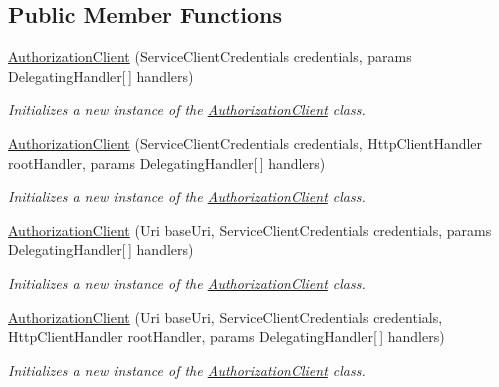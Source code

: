 \subsection*{Public Member Functions}
\begin{DoxyCompactItemize}
\item 
\hyperlink{class_microsoft_1_1_azure_1_1_management_1_1_resources_1_1_authorization_client_a3715cd8839e758d773915b9b58e24d67}{Authorization\+Client} (Service\+Client\+Credentials credentials, params Delegating\+Handler\mbox{[}$\,$\mbox{]} handlers)
\begin{DoxyCompactList}\small\item\em Initializes a new instance of the \hyperlink{class_microsoft_1_1_azure_1_1_management_1_1_resources_1_1_authorization_client}{Authorization\+Client} class. \end{DoxyCompactList}\item 
\hyperlink{class_microsoft_1_1_azure_1_1_management_1_1_resources_1_1_authorization_client_a04f9939262d07f9be68c0634027a2914}{Authorization\+Client} (Service\+Client\+Credentials credentials, Http\+Client\+Handler root\+Handler, params Delegating\+Handler\mbox{[}$\,$\mbox{]} handlers)
\begin{DoxyCompactList}\small\item\em Initializes a new instance of the \hyperlink{class_microsoft_1_1_azure_1_1_management_1_1_resources_1_1_authorization_client}{Authorization\+Client} class. \end{DoxyCompactList}\item 
\hyperlink{class_microsoft_1_1_azure_1_1_management_1_1_resources_1_1_authorization_client_aa176677b15dcb6fc2e40e891c433643e}{Authorization\+Client} (Uri base\+Uri, Service\+Client\+Credentials credentials, params Delegating\+Handler\mbox{[}$\,$\mbox{]} handlers)
\begin{DoxyCompactList}\small\item\em Initializes a new instance of the \hyperlink{class_microsoft_1_1_azure_1_1_management_1_1_resources_1_1_authorization_client}{Authorization\+Client} class. \end{DoxyCompactList}\item 
\hyperlink{class_microsoft_1_1_azure_1_1_management_1_1_resources_1_1_authorization_client_a32698bd9a5e0310181b435b7a1b7e3f6}{Authorization\+Client} (Uri base\+Uri, Service\+Client\+Credentials credentials, Http\+Client\+Handler root\+Handler, params Delegating\+Handler\mbox{[}$\,$\mbox{]} handlers)
\begin{DoxyCompactList}\small\item\em Initializes a new instance of the \hyperlink{class_microsoft_1_1_azure_1_1_management_1_1_resources_1_1_authorization_client}{Authorization\+Client} class. \end{DoxyCompactList}\end{DoxyCompactItemize}
